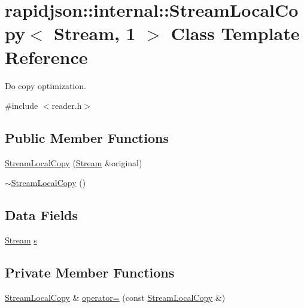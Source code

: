 \hypertarget{classrapidjson_1_1internal_1_1_stream_local_copy_3_01_stream_00_011_01_4}{}\section{rapidjson\+::internal\+::Stream\+Local\+Copy$<$ Stream, 1 $>$ Class Template Reference}
\label{classrapidjson_1_1internal_1_1_stream_local_copy_3_01_stream_00_011_01_4}


Do copy optimization.  




{\ttfamily \#include $<$reader.\+h$>$}

\subsection*{Public Member Functions}
\begin{DoxyCompactItemize}
\item 
\mbox{\hyperlink{classrapidjson_1_1internal_1_1_stream_local_copy_3_01_stream_00_011_01_4_a2146c126669af41f0ebb019966266a81}{Stream\+Local\+Copy}} (\mbox{\hyperlink{classrapidjson_1_1_stream}{Stream}} \&original)
\item 
\mbox{\hyperlink{classrapidjson_1_1internal_1_1_stream_local_copy_3_01_stream_00_011_01_4_a8d5885d3240c69a772b179c443c983df}{$\sim$\+Stream\+Local\+Copy}} ()
\end{DoxyCompactItemize}
\subsection*{Data Fields}
\begin{DoxyCompactItemize}
\item 
\mbox{\hyperlink{classrapidjson_1_1_stream}{Stream}} \mbox{\hyperlink{classrapidjson_1_1internal_1_1_stream_local_copy_3_01_stream_00_011_01_4_a5070d23468ed1bd04aa29f62fe473cd5}{s}}
\end{DoxyCompactItemize}
\subsection*{Private Member Functions}
\begin{DoxyCompactItemize}
\item 
\mbox{\hyperlink{classrapidjson_1_1internal_1_1_stream_local_copy}{Stream\+Local\+Copy}} \& \mbox{\hyperlink{classrapidjson_1_1internal_1_1_stream_local_copy_3_01_stream_00_011_01_4_a9b34a0f36fe1eca7cad1bb443720f4ea}{operator=}} (const \mbox{\hyperlink{classrapidjson_1_1internal_1_1_stream_local_copy}{Stream\+Local\+Copy}} \&)
\end{DoxyCompactItemize}
